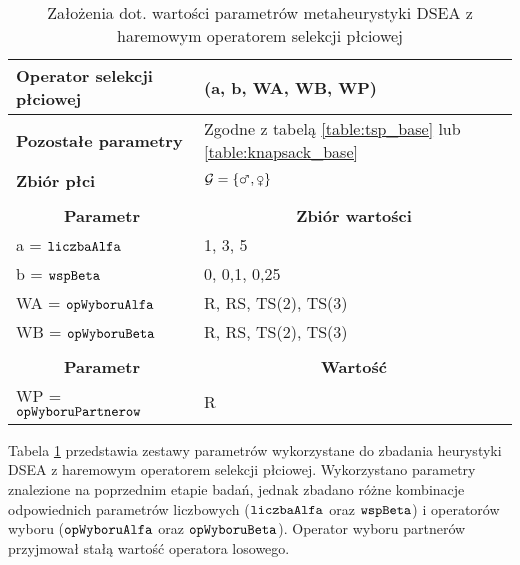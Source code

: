 \documentclass[./FM_mgr.tex]{subfiles}
\begin{document}
\begin{table}
	\caption{Założenia dot. wartości parametrów  metaheurystyki DSEA z haremowym operatorem selekcji płciowej \label{table:dsea_harem}}
	\begin{tabularx}{\linewidth}{lX}
		\hline
		\multicolumn{1}{|l|}{\textbf{Operator selekcji płciowej}} &
		\multicolumn{1}{l|}{\opName{harem}(a, b, WA, WB, WP)} \\ 
		\hline
		\multicolumn{1}{|l|}{\textbf{Pozostałe parametry}} &
		\multicolumn{1}{l|}{Zgodne z tabelą \ref{table:tsp_base} lub \ref{table:knapsack_base}} \\ 
		\hline
		\multicolumn{1}{|l|}{\textbf{Zbiór płci}} & 
		\multicolumn{1}{l|}{$\important{G} = \{ \male, \female \}$} \\ 
		\hline
		& \\ 
		\hline
		\multicolumn{1}{|c|}{\textbf{Parametr}} & 
		\multicolumn{1}{c|}{\textbf{Zbiór wartości}} \\ 
		\hline \hline
		\multicolumn{1}{|l|}{a = $\mathtt{liczbaAlfa}$} & 
		\multicolumn{1}{l|}{1, 3, 5} \\ 
		\hline
		\multicolumn{1}{|l|}{b = $\mathtt{wspBeta}$} & 
		\multicolumn{1}{l|}{0, 0,1, 0,25} \\ 
		\hline
		\multicolumn{1}{|l|}{WA = $\mathtt{opWyboruAlfa}$} & 
		\multicolumn{1}{l|}{R, RS, TS(2), TS(3)} \\ 
		\hline
		\multicolumn{1}{|l|}{WB = $\mathtt{opWyboruBeta}$} & 
		\multicolumn{1}{l|}{R, RS, TS(2), TS(3)} \\ 
		\hline
		& \\ 
		\hline
		\multicolumn{1}{|c|}{\textbf{Parametr}} & 
		\multicolumn{1}{c|}{\textbf{Wartość}} \\ 
		\hline \hline
		\multicolumn{1}{|l|}{WP = $\mathtt{opWyboruPartnerow}$} &
		\multicolumn{1}{l|}{R} \\ 
		\hline
	\end{tabularx}
\end{table}

Tabela \ref{table:dsea_harem} przedstawia zestawy parametrów wykorzystane do zbadania heurystyki DSEA z haremowym operatorem selekcji płciowej.
Wykorzystano parametry znalezione na poprzednim etapie badań, jednak zbadano różne kombinacje odpowiednich parametrów liczbowych ($\mathtt{liczbaAlfa}$ oraz $\mathtt{wspBeta}$) i operatorów wyboru ($\mathtt{opWyboruAlfa}$ oraz $\mathtt{opWyboruBeta}$).
Operator wyboru partnerów przyjmował stałą wartość operatora losowego.
\end{document}
